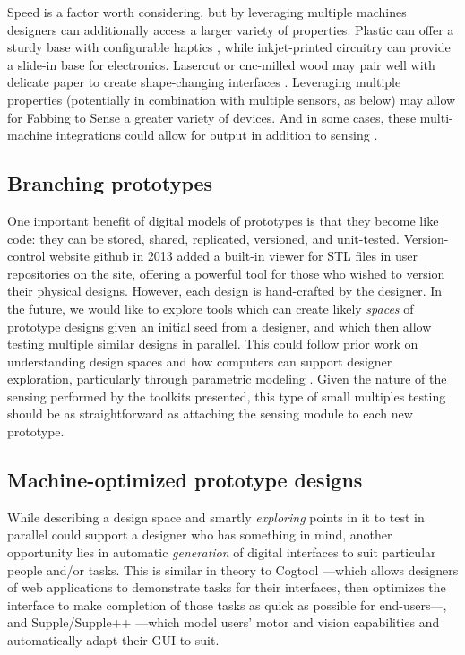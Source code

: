     Speed is a factor worth considering, but by leveraging multiple machines designers can additionally access a larger variety of properties. Plastic can offer a sturdy base with configurable haptics \cite{torres-hapticprint}, while inkjet-printed circuitry can provide a slide-in base for electronics. Lasercut or cnc-milled wood may pair well with delicate paper to create shape-changing interfaces \cite{yao-pneui}. Leveraging multiple properties (potentially in combination with multiple sensors, as below) may allow for Fabbing to Sense a greater variety of devices. And in some cases, these multi-machine integrations could allow for output in addition to sensing \cite{yao-pneui}.

\subsection{Branching prototypes}

One important benefit of digital models of prototypes is that they become like code: they can be stored, shared, replicated, versioned, and unit-tested. Version-control website github \cite{github} in 2013 added a built-in viewer for STL files in user repositories on the site, offering a powerful tool for those who wished to version their physical designs. However, each design is hand-crafted by the designer. In the future, we would like to explore tools which can create likely \emph{spaces} of prototype designs given an initial seed from a designer, and which then allow testing multiple similar designs in parallel. This could follow prior work on understanding design spaces and how computers can support designer exploration, particularly through parametric modeling \cite{woodbury-designspace, woodbury-parametric}. Given the nature of the sensing performed by the toolkits presented, this type of small multiples testing should be as straightforward as attaching the sensing module to each new prototype.

\subsection{Machine-optimized prototype designs}

While describing a design space and smartly \emph{exploring} points in it to test in parallel could support a designer who has something in mind, another opportunity lies in automatic \emph{generation} of digital interfaces to suit particular people and/or tasks. This is similar in theory to Cogtool \cite{john-cogtool}---which allows designers of web applications to demonstrate tasks for their interfaces, then optimizes the interface to make completion of those tasks as quick as possible for end-users---, and Supple/Supple++ \cite{gajos-supple,gajos-supplepp}---which model users' motor and vision capabilities and automatically adapt their GUI to suit.

